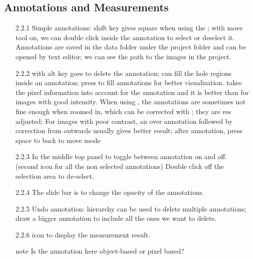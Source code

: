 \documentclass[a4paper,12pt]{article}
\begin{document}
\subsection{Annotations and Measurements}
\begin{enumerate}
        \item[2.2.1] Simple annotations: shift key gives square when using the \soln {}\solnend; with move tool on, we can double click inside the annotation to select or deselect it. Annotations are saved in the data folder under the project folder and can be opened by text editor; we can see the path to the images in the project. 
       \item[2.2.2] \soln {} \solnend with alt key goes to delete the annotation; \soln {} \solnend can fill the hole regions inside an annotation; press \soln {} \solnend to fill annotations for better visualization. \soln {} \solnend takes the pixel information into account for the annotation and it is better than \soln {} \solnend for images with good intensity. When using  \soln {}\solnend, the annotations are sometimes not fine enough when zoomed in, which can be corrected with \soln {} \solnend; they are res adjusted; For images with poor contrast, an over annotation followed by correction from outwards usually gives better result; after annotation, press space to back to move mode
       \item[2.2.3] In the middle top panel \soln {} \solnend to toggle between annotation on and off. (second icon for all the non selected annotations) Double click off the selection area to de-select. 
       \item[2.2.4] The slide bar is to change the opacity of the annotations.
       \item[2.2.5] Undo annotation: hierarchy can be used to delete multiple annotations; draw a bigger annotation to include all the ones we want to delete.    
       \item[2.2.6]\soln {} \solnend icon to display the measurement result.
       \item[note] Is the annotation here object-based or pixel based?
\end{enumerate}
\end{document}
